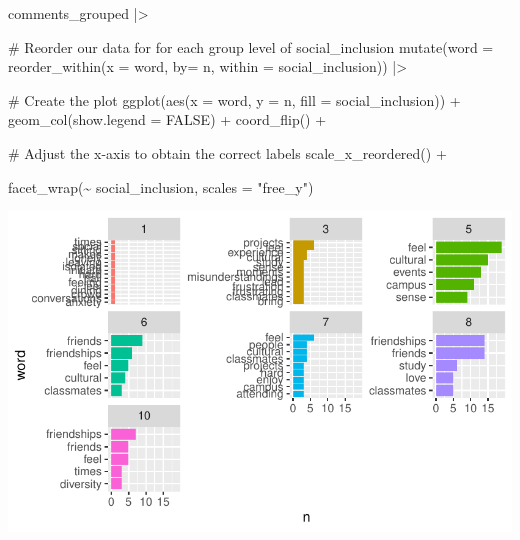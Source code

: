 \documentclass[
  letterpaper,
]{krantz}
\makeatletter
\newenvironment{Shaded}{\begin{snugshade}}{\end{snugshade}}
\newcommand{\AttributeTok}[1]{\textcolor[rgb]{0.40,0.45,0.13}{#1}}
\newcommand{\CommentTok}[1]{\textcolor[rgb]{0.37,0.37,0.37}{#1}}
\newcommand{\ConstantTok}[1]{\textcolor[rgb]{0.56,0.35,0.01}{#1}}
\newcommand{\FunctionTok}[1]{\textcolor[rgb]{0.28,0.35,0.67}{#1}}
\newcommand{\NormalTok}[1]{\textcolor[rgb]{0.00,0.23,0.31}{#1}}
\newcommand{\SpecialCharTok}[1]{\textcolor[rgb]{0.37,0.37,0.37}{#1}}
\newcommand{\StringTok}[1]{\textcolor[rgb]{0.13,0.47,0.30}{#1}}
\newenvironment{kframe}{%
\medskip{}
\setlength{\fboxsep}{.8em}
 \def\at@end@of@kframe{}%
 \ifinner\ifhmode%
  \def\at@end@of@kframe{\end{minipage}}%
  \begin{minipage}{\columnwidth}%
 \fi\fi%
 \def\FrameCommand##1{\hskip\@totalleftmargin \hskip-\fboxsep
 \colorbox{shadecolor}{##1}\hskip-\fboxsep
     \hskip-\linewidth \hskip-\@totalleftmargin \hskip\columnwidth}%
 \MakeFramed {\advance\hsize-\width
   \@totalleftmargin\z@ \linewidth\hsize
   \@setminipage}}%
 {\par\unskip\endMakeFramed%
 \at@end@of@kframe}
\renewenvironment{Shaded}{\begin{kframe}}{\end{kframe}}
\makeatother
\begin{document}
\begin{Shaded}
\begin{Highlighting}[]
\NormalTok{comments\_grouped }\SpecialCharTok{|\textgreater{}}
  
  \CommentTok{\# Reorder our data for for each group level of social\_inclusion}
  \FunctionTok{mutate}\NormalTok{(}\AttributeTok{word =} \FunctionTok{reorder\_within}\NormalTok{(}\AttributeTok{x =}\NormalTok{ word,}
                               \AttributeTok{by=}\NormalTok{ n,}
                               \AttributeTok{within =}\NormalTok{ social\_inclusion)) }\SpecialCharTok{|\textgreater{}}

 \CommentTok{\# Create the plot}
    \FunctionTok{ggplot}\NormalTok{(}\FunctionTok{aes}\NormalTok{(}\AttributeTok{x =}\NormalTok{ word,}
               \AttributeTok{y =}\NormalTok{ n,}
               \AttributeTok{fill =}\NormalTok{ social\_inclusion)) }\SpecialCharTok{+}
  \FunctionTok{geom\_col}\NormalTok{(}\AttributeTok{show.legend =} \ConstantTok{FALSE}\NormalTok{) }\SpecialCharTok{+}
  \FunctionTok{coord\_flip}\NormalTok{() }\SpecialCharTok{+}

  \CommentTok{\# Adjust the x{-}axis to obtain the correct labels    }
  \FunctionTok{scale\_x\_reordered}\NormalTok{() }\SpecialCharTok{+}
      
  \FunctionTok{facet\_wrap}\NormalTok{(}\SpecialCharTok{\textasciitilde{}}\NormalTok{ social\_inclusion,}
             \AttributeTok{scales =} \StringTok{"free\_y"}\NormalTok{)}
\end{Highlighting}
\end{Shaded}

\includegraphics{14_mixed_methods_files/figure-pdf/visualise-social-inclusion-groups-words-n-04-1.pdf}
\end{document}
